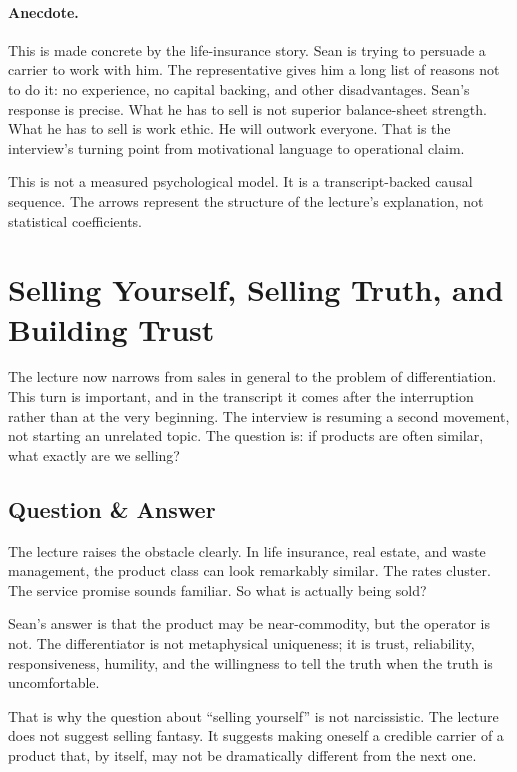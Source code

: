\paragraph{Anecdote.}
This is made concrete by the life-insurance story. Sean is trying to persuade a carrier to work with him. The representative gives him a long list of reasons not to do it: no experience, no capital backing, and other disadvantages. Sean's response is precise. What he has to sell is not superior balance-sheet strength. What he has to sell is work ethic. He will outwork everyone. That is the interview's turning point from motivational language to operational claim.

\begin{remark}
This is not a measured psychological model. It is a transcript-backed causal sequence. The arrows represent the structure of the lecture's explanation, not statistical coefficients.
\end{remark}

\section{Selling Yourself, Selling Truth, and Building Trust}

The lecture now narrows from sales in general to the problem of differentiation. This turn is important, and in the transcript it comes after the interruption rather than at the very beginning. The interview is resuming a second movement, not starting an unrelated topic. The question is: if products are often similar, what exactly are we selling?

\subsection{Question \& Answer}

The lecture raises the obstacle clearly. In life insurance, real estate, and waste management, the product class can look remarkably similar. The rates cluster. The service promise sounds familiar. So what is actually being sold?

Sean's answer is that the product may be near-commodity, but the operator is not. The differentiator is not metaphysical uniqueness; it is trust, reliability, responsiveness, humility, and the willingness to tell the truth when the truth is uncomfortable.

That is why the question about ``selling yourself'' is not narcissistic. The lecture does not suggest selling fantasy. It suggests making oneself a credible carrier of a product that, by itself, may not be dramatically different from the next one.

